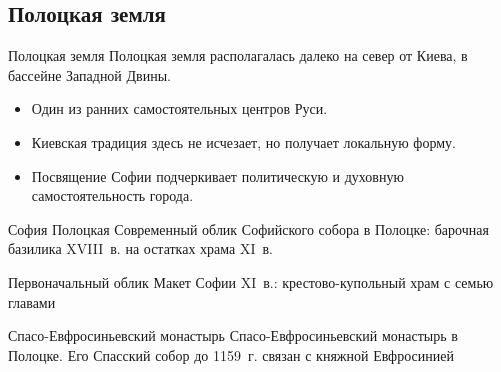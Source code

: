 \subsection{Полоцкая земля}

\begin{frame}{Полоцкая земля}
  Полоцкая земля располагалась далеко на север от Киева,
  в бассейне Западной Двины.
  \begin{itemize}
    \item Один из ранних самостоятельных центров Руси.
    \item Киевская традиция здесь не исчезает, но получает локальную форму.
    \item Посвящение Софии подчеркивает политическую и духовную
          самостоятельность города.
  \end{itemize}
\end{frame}

\begin{frame}{София Полоцкая}
    {Современный облик Софийского собора в Полоцке:
     барочная базилика XVIII~в. на остатках храма XI~в.}
\end{frame}


\begin{frame}{Первоначальный облик}
    {Макет Софии XI~в.: крестово-купольный храм с семью главами}
\end{frame}


\begin{frame}{Спасо-Евфросиньевский монастырь}
    {Спасо-Евфросиньевский монастырь в Полоцке.
     Его Спасский собор до 1159~г. связан с княжной Евфросинией}
\end{frame}

